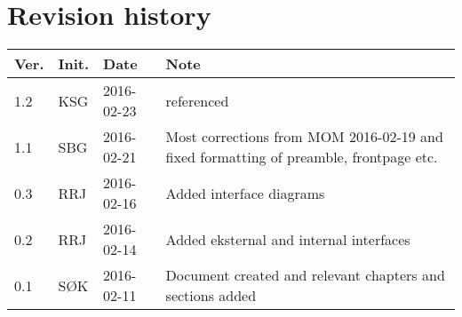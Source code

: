 \label{chp_revisionHistory}
\chapter*{Revision history}

\renewcommand\arraystretch{1.5}
\begin{tabular}{b{1cm} b{1cm} b{2cm} b{8cm}}
	\textbf{Ver.} & \textbf{Init.} & \textbf{Date} & \textbf{Note}\\
	\hline
	1.2 & KSG & 2016-02-23 & \aadisddd referenced \\
    \hline
    1.1 & SBG & 2016-02-21 & Most corrections from MOM 2016-02-19 and fixed formatting of preamble, frontpage etc.\\
    \hline
    0.3 & RRJ & 2016-02-16 & Added interface diagrams \\
    \hline
    0.2 & RRJ & 2016-02-14 & Added eksternal and internal interfaces \\
    \hline
    0.1 & SØK & 2016-02-11 & Document created and relevant chapters and sections added \\
\end{tabular}
\renewcommand\arraystretch{1.2}